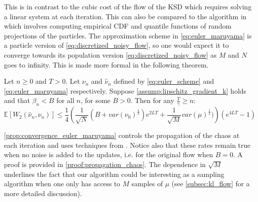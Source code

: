 This is in contrast to the cubic cost of the flow of the KSD \cite{Mroueh:2019} which requires solving a linear system at each iteration. This can also be compared to the algorithm in  \cite{csimcsekli2018sliced} which involves computing empirical CDF and quantile functions of random projections of the particles.
The approximation scheme in \cref{eq:euler_maruyama} is a particle version of \cref{eq:discretized_noisy_flow}, so one would expect it to converge towards its population version  \cref{eq:discretized_noisy_flow} as $M$ and $N$ goes to infinity. This is made more formal in the following theorem.
\begin{theorem}\label{prop:convergence_euler_maruyama}
 Let $n\ge 0$ and $T>0$. Let $\nu_n$ and $\hat{\nu}_n$ defined by \eqref{eq:euler_scheme} and \eqref{eq:euler_maruyama} respectively. Suppose \cref{assump:lipschitz_gradient_k} holds and that $\beta_n<B$ for all $n$, for some $B>0$. Then for any $\frac{T}{\gamma}\geq n$:
\[
\mathbb{E}[W_{2}(\hat{\nu}_{n},\nu_{n})]\leq \frac{1}{4}\left(\frac{1}{\sqrt{N}}(B+var(\nu_{0})^{\frac{1}{2}})e^{2LT}+\frac{1}{\sqrt{M}}var(\mu)^{\frac{1}{2}})\right)(e^{4LT}-1)
\]
\end{theorem}
\cref{prop:convergence_euler_maruyama} controls the propagation of the chaos at each iteration and uses techniques from \cite{jourdain2007nonlinear}. Notice also that these rates remain true when no noise is added to the updates, i.e. for the original flow when $B=0$. A proof is provided in \cref{proof:propagation_chaos}. The dependence in $\sqrt{M}$ underlines the fact that our algorithm could be interesting as a sampling algorithm when one only has access to $M$ samples of $\mu$ (see \cref{subsec:kl_flow} for a more detailed discussion).

